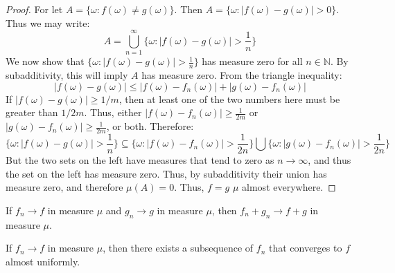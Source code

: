             \begin{proof}
                For let $A=\{\omega:f(\omega)\ne{g}(\omega)\}$.
                Then $A=\{\omega:|f(\omega)-g(\omega)|>0\}$.
                Thus we may write:
                \begin{equation}
                    A=\bigcup_{n=1}^{\infty}
                    \Big\{\omega:|f(\omega)-g(\omega)|>\frac{1}{n}
                    \Big\}
                \end{equation}
                We now show that
                $\{\omega:|f(\omega)-g(\omega)|>\frac{1}{n}\}$
                has measure zero for all $n\in\mathbb{N}$. By
                subadditivity, this will imply $A$ has measure zero.
                From the triangle inequality:
                \begin{equation}
                    |f(\omega)-g(\omega)|\leq
                    |f(\omega)-f_{n}(\omega)|+
                    |g(\omega)-f_{n}(\omega)|
                \end{equation}
                If $|f(\omega)-g(\omega)|\geq{1/m}$, then at
                least one of the two numbers here must be greater
                than $1/2m$. Thus, either
                $|f(\omega)-f_{n}(\omega)|\geq\frac{1}{2m}$ or
                $|g(\omega)-f_{n}(\omega)|\geq\frac{1}{2m}$, or
                both. Therefore:
                \begin{equation}
                    \{\omega:|f(\omega)-g(\omega)|>\frac{1}{n}\}
                    \subseteq
                    \{\omega:|f(\omega)-f_{n}(\omega)|>\frac{1}{2n}
                    \}\bigcup
                    \{\omega:|g(\omega)-f_{n}(\omega)|>\frac{1}{2n}
                    \}
                \end{equation}
                But the two sets on the left have measures that
                tend to zero as $n\rightarrow\infty$, and thus
                the set on the left has measure zero. Thus, by
                subadditivity their union has measure zero, and
                therefore $\mu(A)=0$. Thus, $f=g$ $\mu$ almost
                everywhere.
            \end{proof}
            \begin{theorem}
                If $f_{n}\rightarrow{f}$ in measure $\mu$ and
                $g_{n}\rightarrow{g}$ in measure $\mu$, then
                $f_{n}+g_{n}\rightarrow{f+g}$ in measure $\mu$.
            \end{theorem}
            \begin{theorem}
                If $f_{n}\rightarrow{f}$ in measure $\mu$, then
                there exists a subsequence of $f_{n}$ that converges
                to $f$ almost uniformly.
            \end{theorem}
